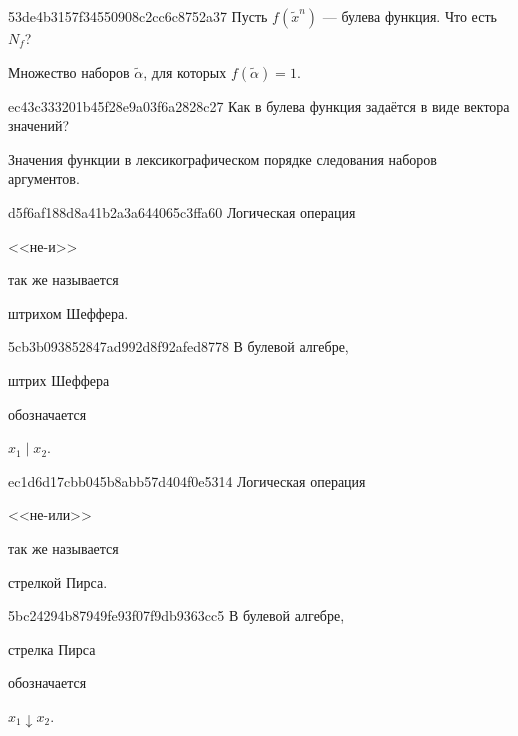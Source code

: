 \begin{note}{53de4b3157f34550908c2cc6c8752a37}
    Пусть \({ f(\widetilde x^{n}) }\) --- булева функция.
    Что есть \({ N_{f} }\)?

    \begin{cloze}{1}
        Множество наборов \({ \widetilde \alpha }\), для которых \({ f(\widetilde \alpha) = 1 }\).
    \end{cloze}
\end{note}

\begin{note}{ec43c333201b45f28e9a03f6a2828c27}
    Как в булева функция задаётся в виде вектора значений?

    \begin{cloze}{1}
        Значения функции в лексикографическом порядке следования наборов аргументов.
    \end{cloze}
\end{note}

\begin{note}{d5f6af188d8a41b2a3a644065c3ffa60}
    Логическая операция \begin{icloze}{2}<<не-и>>\end{icloze} так же называется \begin{icloze}{1}штрихом Шеффера.\end{icloze}
\end{note}

\begin{note}{5cb3b093852847ad992d8f92afed8778}
    В булевой алгебре, \begin{icloze}{2}штрих Шеффера\end{icloze} обозначается \begin{icloze}{1}\({ x_1 \mid x_2 }\).\end{icloze}
\end{note}

\begin{note}{ec1d6d17cbb045b8abb57d404f0e5314}
    Логическая операция \begin{icloze}{2}<<не-или>>\end{icloze} так же называется \begin{icloze}{1}стрелкой Пирса.\end{icloze}
\end{note}

\begin{note}{5bc24294b87949fe93f07f9db9363cc5}
    В булевой алгебре, \begin{icloze}{2}стрелка Пирса\end{icloze} обозначается \begin{icloze}{1}\({ x_1 \downarrow x_2 }\).\end{icloze}
\end{note}


